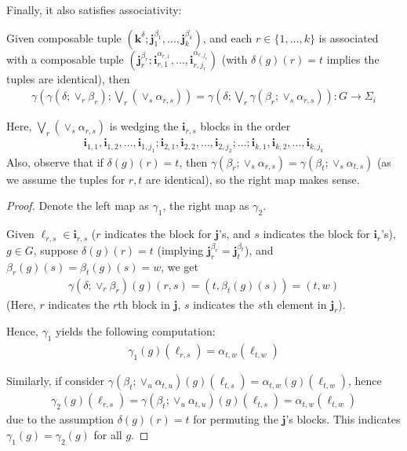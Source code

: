 \documentclass{article}
\begin{document}
\hfil

Finally, it also satisfies associativity:
\begin{prop}
    Given composable tuple $(\mathbf{k}^\delta;\mathbf{j}_1^{\beta_1},...,\mathbf{j}_k^{\beta_k})$, and each $r\in\{1,...,k\}$ is associated with a composable tuple $(\mathbf{j}_r^{\beta_r};\mathbf{i}_{r,1}^{\alpha_{r,1}},...,\mathbf{i}_{r,j_r}^{\alpha_{r,j_r}})$ (with $\delta(g)(r)=t$ implies the tuples are identical), then
    \begin{align*}
        \gamma\left(\gamma(\delta;\vee_r\beta_r);\bigvee_r\left(\vee_s \alpha_{r,s}\right)\right) = \gamma\left(\delta;\bigvee_r \gamma(\beta_r;\vee_s\alpha_{r,s})\right):G\rightarrow \Sigma_i
    \end{align*}
\end{prop}
Here, $\bigvee_r\left(\vee_s \alpha_{r,s}\right)$ is wedging the $\mathbf{i}_{r,s}$ blocks in the order
\begin{align*}
    \mathbf{i}_{1,1},\mathbf{i}_{1,2},...,\mathbf{i}_{1,j_1};\mathbf{i}_{2,1},\mathbf{i}_{2,2},...,\mathbf{i}_{2,j_2};...;\mathbf{i}_{k,1},\mathbf{i}_{k,2},...,\mathbf{i}_{k,j_k}
\end{align*}
Also, observe that if $\delta(g)(r)=t$, then $\gamma(\beta_r;\vee_s\alpha_{r,s})=\gamma(\beta_t;\vee_s\alpha_{t,s})$ (as we assume the tuples for $r,t$ are identical), so the right map makes sense.
\begin{proof}
    Denote the left map as $\gamma_1$, the right map as $\gamma_2$. 

    \hfil
    
    Given $\ell_{r,s}\in\mathbf{i}_{r,s}$ ($r$ indicates the block for $\mathbf{j}$'s, and $s$ indicates the block for $\mathbf{i}_r$'s), $g\in G$, suppose $\delta(g)(r)=t$ (implying $\mathbf{j}_r^{\beta_r}=\mathbf{j}_t^{\beta_t}$), and $\beta_r(g)(s)=\beta_t(g)(s) = w$, we get 
    \begin{align*}
        \gamma(\delta;\vee_r \beta_r)(g)(r,s) = (t, \beta_t(g)(s)) = (t,w)
    \end{align*}
    (Here, $r$ indicates the $r$th block in $\mathbf{j}$, $s$ indicates the $s$th element in $\mathbf{j}_r$).

    Hence, $\gamma_1$ yields the following computation:
    \begin{align*}
        \gamma_1(g)(\ell_{r,s}) = \alpha_{t,w}(\ell_{t,w})
    \end{align*}
    
    \hfil

    Similarly, if consider $\gamma(\beta_t;\vee_u\alpha_{t,u})(g)(\ell_{t,s}) = \alpha_{t,w}(g)(\ell_{t,w})$, hence 
    \begin{align*}
        \gamma_2(g)(\ell_{r,s}) = \gamma(\beta_t;\vee_u\alpha_{t,u})(g)(\ell_{t,s}) = \alpha_{t,w}(\ell_{t,w})
    \end{align*}
    due to the assumption $\delta(g)(r)=t$ for permuting the $\mathbf{j}$'s blocks. This indicates $\gamma_1(g)=\gamma_2(g)$ for all $g$.
\end{proof}
\end{document}
